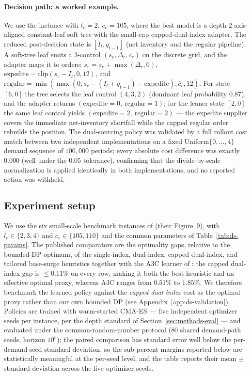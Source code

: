 \documentclass[11pt]{article}
\begin{document}
\paragraph{Decision path: a worked example.}
We use the instance with $l_r=2$, $c_e=105$, where the best model is a depth-2 axis-aligned
constant-leaf soft tree with the small-cap capped-dual-index adapter. The reduced post-decision state
is $[I_t, q_{t-1}]$ (net inventory and the regular pipeline). A soft-tree leaf emits a $3$-control
$(s_e,\Delta_r,\bar c_r)$ on the discrete grid, and the adapter maps it to orders:
$s_r=s_e+\max(\Delta_r,0)$, $\text{expedite}=\mathrm{clip}(s_e-I_t,0,12)$, and
$\text{regular}=\min(\max(0,s_r-(I_t+q_{t-1})-\text{expedite}),\bar c_r,12)$. For state $[6,0]$ the tree
selects the leaf control $(4,3,2)$ (dominant leaf probability $0.87$), and the adapter returns
$(\text{expedite}=0,\ \text{regular}=1)$; for the leaner state $[2,0]$ the same leaf control yields
$(\text{expedite}=2,\ \text{regular}=2)$ --- the expedite supplier covers the immediate net-inventory
shortfall while the capped regular order rebuilds the position. The dual-sourcing policy was validated
by a full rollout cost match between two independent implementations on a fixed Uniform$\{0,\dots,4\}$ demand sequence of
$100{,}000$ periods; every absolute cost difference was exactly $0.000$ (well under the $0.05$
tolerance), confirming that the divide-by-scale normalization is applied identically in both
implementations, and no reported action was withheld.

\subsection{Experiment setup}

We use the six small-scale benchmark instances of \citet{gijsbrechts2022drl} (their Figure~9),
with $l_r\in\{2,3,4\}$ and $c_e\in\{105,110\}$ and the common parameters of
Table~\ref{tab:ds-params}. The published comparators are the optimality gaps, relative to the
bounded-DP optimum, of the single-index, dual-index, capped dual-index, and tailored base-surge
heuristics together with the A3C learner of \citet{gijsbrechts2022drl}: the capped dual-index gap
is $\le0.11\%$ on every row, making it both the best heuristic and an effective optimal proxy,
whereas A3C ranges from $0.51\%$ to $1.85\%$. We therefore benchmark the learned policy against the
\emph{capped dual-index} cost as the optimal proxy rather than our own bounded DP
(see Appendix~\ref{app:ds-validation}). Policies are trained with warm-started CMA-ES --- five independent optimizer seeds per
instance, per the depth standard of Section~\ref{sec:methods-eval} --- and evaluated
under the common-random-number protocol ($80$ shared demand-path
seeds, horizon $10^5$); the paired comparison has standard error well below the per-demand-seed
standard deviation, so the sub-percent margins reported below are statistically
meaningful at the per-seed level, and the table reports their mean $\pm$ standard deviation across
the five optimizer seeds.
\end{document}
